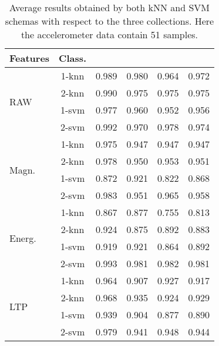 \documentclass[twocolumn]{svjour3}          \smartqed  \usepackage[draft]{hyperref}
\begin{document}
   \begin{table}[tb]
\scriptsize
\centering
\begin{tabular}{lccccc}
	Features&Class.	&	 &	 &		&	 \\
\hline \multirow{4}{*}{RAW}	&1-knn&	0.989&	0.980&	0.964&	0.972\\ 
&2-knn&	0.990&	0.975&	0.975&	0.975\\ 
&1-svm&	0.977&	0.960&	0.952&	0.956\\ 
&2-svm&	0.992&	0.970&	0.978&	0.974\\ 
[2pt] 
\hline 
\multirow{4}{*}{Magn.}	&1-knn&	0.975&	0.947&	0.947&	0.947\\ 
&2-knn&	0.978&	0.950&	0.953&	0.951\\ 
&1-svm&	0.872&	0.921&	0.822&	0.868\\ 
&2-svm&	0.983&	0.951&	0.965&	0.958\\ 
[2pt] 
\hline 
\multirow{4}{*}{Energ.}	&1-knn&	0.867&	0.877&	0.755&	0.813\\ 
&2-knn&	0.924&	0.875&	0.892&	0.883\\ 
&1-svm&	0.919&	0.921&	0.864&	0.892\\ 
&2-svm&	0.993&	0.981&	0.982&	0.981\\ 
[2pt] 
\hline 
\multirow{4}{*}{LTP}	&1-knn&	0.964&	0.907&	0.927&	0.917\\ 
&2-knn&	0.968&	0.935&	0.924&	0.929\\ 
&1-svm&	0.939&	0.904&	0.877&	0.890\\ 
&2-svm&	0.979&	0.941&	0.948&	0.944\\ 
[2pt] 
\hline 
\end{tabular}
\medskip
\caption{Average results obtained by both kNN and SVM schemas with respect to the three collections. Here the accelerometer data contain 51 samples.}
\label{table:summary-1-51}
 \end{table}
 
\end{document}
